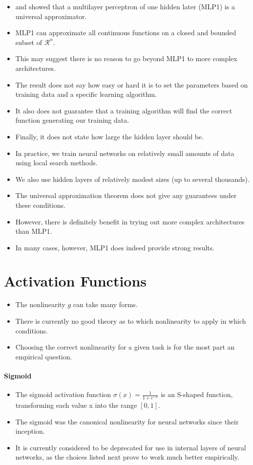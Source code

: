 \begin{itemize}
\item \cite{hornik1989multilayer} and \cite{cybenko1989approximation} showed that a multilayer perceptron of one hidden later (MLP1) is a universal approximator.
\item MLP1 can approximate all continuous functions on a closed and bounded subset of $\mathcal{R}^n$.
\item This may suggest there is no reason to go beyond MLP1 to more complex architectures.
\item The result does not say how easy or hard it is to set the parameters based on training data and a specific learning algorithm.
\item It also does not guarantee that a training algorithm will find
the correct function generating our training data.
\item Finally, it does not state how large the hidden layer should be.
\item In practice, we train neural networks on relatively small amounts of data using local search methods.
\item We also use hidden layers of relatively modest sizes (up to several thousands). 
\item The universal approximation theorem does not give any guarantees under these conditions.
\item However, there is definitely benefit in trying out more complex architectures than MLP1. 
\item In many cases, however, MLP1 does indeed provide strong results.
\end{itemize}



\section{Activation Functions}
\begin{itemize}
\item The nonlinearity $g$ can take many forms. 
\item There is currently no good theory as to which nonlinearity to apply in which conditions.
\item Choosing the correct nonlinearity for a given task is for the most part an empirical question.
\end{itemize}




\paragraph{Sigmoid}
\begin{itemize}
\item The sigmoid activation function $\sigma(x) = \frac{1}{1+e^{-x}}$ is an S-shaped function, transforming each value x into the range $[0, 1]$.
\item The sigmoid was the canonical nonlinearity for neural networks since their inception.
\item It is currently considered to be deprecated for use in internal layers of neural networks, as the choices listed next prove to work much better empirically.
\end{itemize}


